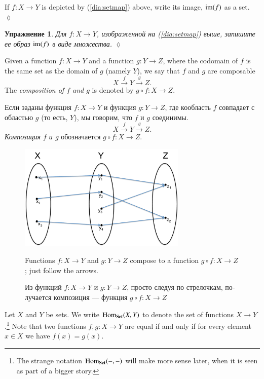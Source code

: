\documentclass[a4paper]{book}
\def\tn{\textnormal}
\def\Hom{\tn{Hom}}
\def\im{\tn{im}}
\def\to{\rightarrow}
\def\taking{\colon}
\newcommand{\Too}[1]{\xrightarrow{\ \ #1\ \ }}
\def\Set{{\bf Set}}
\theoremstyle{myth}
\newtheorem{excENG}[envENG]{\begin{english}Exercise\end{english}}
\newenvironment{exerciseENG}{\begin{excENG}}{\hspace*{\fill}$\lozenge$\end{excENG}}
\newtheorem{excRUS}[envRUS]{Упражнение}
\newenvironment{exerciseRUS}{\begin{excRUS}}{\hspace*{\fill}$\lozenge$\end{excRUS}}
\begin{document}
\begin{russian}
\begin{exerciseENG}
If $f\taking X\to Y$ is depicted by (\ref{dia:setmap}) above, write its image, $\im(f)$ as a set.
\end{exerciseENG}

\begin{exerciseRUS}
Для $f\taking X\to Y$, изображенной на (\ref{dia:setmap}) выше, запишите ее образ $\im(f)$ в виде множества.
\end{exerciseRUS}

Given a function $f\taking X\to Y$ and a function $g\taking Y\to Z$, where the codomain of $f$ is the same set as the domain of $g$ (namely $Y$), we say that $f$ and $g$ are composable $$X\Too{f}Y\Too{g}Z.$$ The {\em composition of $f$ and $g$}\label{function composition} is denoted by $g\circ f\taking X\to Z$. 

Если заданы функция $f\taking X\to Y$ и функция $g\taking Y\to Z$, где кообласть $f$ совпадает с областью $g$ (то есть, $Y$), мы говорим, что $f$ и $g$ соединимы. $$X\Too{f}Y\Too{g}Z.$$ {\em Композиция $f$ и $g$}\label{function composition} обозначается $g\circ f\taking X\to Z$. 

\begin{figure}[h]
\begin{center}
\includegraphics[height=2in]{composition}
\end{center}
\caption{Functions $f\taking X\to Y$ and $g\taking Y\to Z$ compose to a function $g\circ f\taking X\to Z$; just follow the arrows.}
\caption{Из функций $f\taking X\to Y$ и $g\taking Y\to Z$, просто следуя по стрелочкам, получается композиция — функция $g\circ f\taking X\to Z$}
\end{figure}

Let $X$ and $Y$ be sets. We write $\Hom_\Set(X,Y)$\index{a symbol!$\Hom_\Set$} to denote the set of functions $X\to Y$.\footnote{The strange notation $\Hom_\Set(-,-)$ will make more sense later, when it is seen as part of a bigger story.} 
Note that two functions $f,g\taking X\to Y$ are equal if and only if for every element $x\in X$ we have $f(x)=g(x)$. 


\end{russian}
\end{document}
